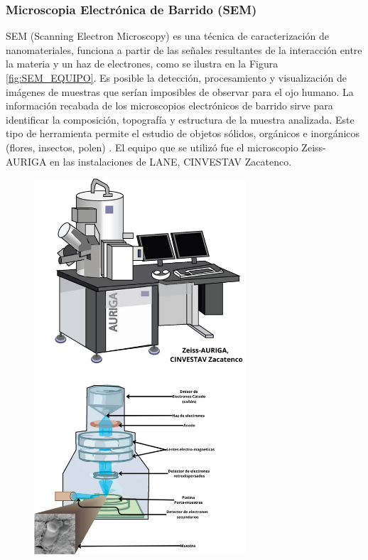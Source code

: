 \documentclass[12pt]{article}
\begin{document}
        \subsubsection{Microscopia Electrónica de Barrido (SEM)}
            SEM (Scanning Electron Microscopy) es una técnica de caracterización de nanomateriales, funciona a partir de las señales resultantes de la interacción entre la materia y un haz de electrones, como se ilustra en la Figura \ref{fig:SEM_EQUIPO}. Es posible la detección, procesamiento y visualización de imágenes de muestras que serían imposibles de observar para el ojo humano.  La información recabada de los microscopios electrónicos de barrido sirve para identificar la composición, topografía y estructura de la muestra analizada. Este tipo de herramienta permite el estudio de objetos sólidos, orgánicos e inorgánicos (flores, insectos, polen) \cite{IEEEreferencias:Ref13}.
                El equipo que se utilizó fue el microscopio Zeiss-AURIGA en las instalaciones de LANE, CINVESTAV Zacatenco.
        \begin{figure}[H]
            	   \begin{center}
             	  	\includegraphics[width = 0.7\textwidth]{Imagenes/SEM_EQUIPO.png}
            	   \end{center} 
                \end{figure}
        
\end{document}
